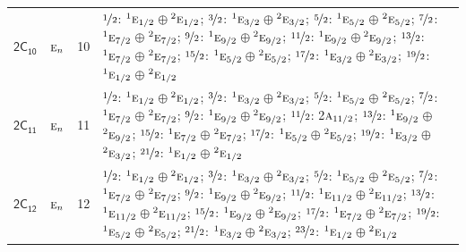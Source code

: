\documentclass[10pt,a4paper]{article}
\numberwithin{equation}{section}
\newcommand{\grp}[1]{\mathsf{#1}}
\newcommand{\irr}[1]{\text{\normalfont\scshape #1}}
\newcommand{\conjpair}[1]{{}^{#1}}
\newlength{\fillwidth}\newlength{\cellwidth}\newlength{\colwidth}
\begin{document}
{\begin{longtable}{@{}llr>{\RaggedRight\arraybackslash}p{\fillwidth}@{}}
\href{2C10.pdf}{$\grp{2C_{10}}$} & $\irr{e}_{n}$ & 10 & $\nicefrac{1}{2}$: $\conjpair{1}\irr{e}_{1/2}$${}\oplus{}$$\conjpair{2}\irr{e}_{1/2}$; $\nicefrac{3}{2}$: $\conjpair{1}\irr{e}_{3/2}$${}\oplus{}$$\conjpair{2}\irr{e}_{3/2}$; $\nicefrac{5}{2}$: $\conjpair{1}\irr{e}_{5/2}$${}\oplus{}$$\conjpair{2}\irr{e}_{5/2}$; $\nicefrac{7}{2}$: $\conjpair{1}\irr{e}_{7/2}$${}\oplus{}$$\conjpair{2}\irr{e}_{7/2}$; $\nicefrac{9}{2}$: $\conjpair{1}\irr{e}_{9/2}$${}\oplus{}$$\conjpair{2}\irr{e}_{9/2}$; $\nicefrac{11}{2}$: $\conjpair{1}\irr{e}_{9/2}$${}\oplus{}$$\conjpair{2}\irr{e}_{9/2}$; $\nicefrac{13}{2}$: $\conjpair{1}\irr{e}_{7/2}$${}\oplus{}$$\conjpair{2}\irr{e}_{7/2}$; $\nicefrac{15}{2}$: $\conjpair{1}\irr{e}_{5/2}$${}\oplus{}$$\conjpair{2}\irr{e}_{5/2}$; $\nicefrac{17}{2}$: $\conjpair{1}\irr{e}_{3/2}$${}\oplus{}$$\conjpair{2}\irr{e}_{3/2}$; $\nicefrac{19}{2}$: $\conjpair{1}\irr{e}_{1/2}$${}\oplus{}$$\conjpair{2}\irr{e}_{1/2}$\\
\href{2C11.pdf}{$\grp{2C_{11}}$} & $\irr{e}_{n}$ & 11 & $\nicefrac{1}{2}$: $\conjpair{1}\irr{e}_{1/2}$${}\oplus{}$$\conjpair{2}\irr{e}_{1/2}$; $\nicefrac{3}{2}$: $\conjpair{1}\irr{e}_{3/2}$${}\oplus{}$$\conjpair{2}\irr{e}_{3/2}$; $\nicefrac{5}{2}$: $\conjpair{1}\irr{e}_{5/2}$${}\oplus{}$$\conjpair{2}\irr{e}_{5/2}$; $\nicefrac{7}{2}$: $\conjpair{1}\irr{e}_{7/2}$${}\oplus{}$$\conjpair{2}\irr{e}_{7/2}$; $\nicefrac{9}{2}$: $\conjpair{1}\irr{e}_{9/2}$${}\oplus{}$$\conjpair{2}\irr{e}_{9/2}$; $\nicefrac{11}{2}$: 2$\irr{a}_{11/2}$; $\nicefrac{13}{2}$: $\conjpair{1}\irr{e}_{9/2}$${}\oplus{}$$\conjpair{2}\irr{e}_{9/2}$; $\nicefrac{15}{2}$: $\conjpair{1}\irr{e}_{7/2}$${}\oplus{}$$\conjpair{2}\irr{e}_{7/2}$; $\nicefrac{17}{2}$: $\conjpair{1}\irr{e}_{5/2}$${}\oplus{}$$\conjpair{2}\irr{e}_{5/2}$; $\nicefrac{19}{2}$: $\conjpair{1}\irr{e}_{3/2}$${}\oplus{}$$\conjpair{2}\irr{e}_{3/2}$; $\nicefrac{21}{2}$: $\conjpair{1}\irr{e}_{1/2}$${}\oplus{}$$\conjpair{2}\irr{e}_{1/2}$\\
\href{2C12.pdf}{$\grp{2C_{12}}$} & $\irr{e}_{n}$ & 12 & $\nicefrac{1}{2}$: $\conjpair{1}\irr{e}_{1/2}$${}\oplus{}$$\conjpair{2}\irr{e}_{1/2}$; $\nicefrac{3}{2}$: $\conjpair{1}\irr{e}_{3/2}$${}\oplus{}$$\conjpair{2}\irr{e}_{3/2}$; $\nicefrac{5}{2}$: $\conjpair{1}\irr{e}_{5/2}$${}\oplus{}$$\conjpair{2}\irr{e}_{5/2}$; $\nicefrac{7}{2}$: $\conjpair{1}\irr{e}_{7/2}$${}\oplus{}$$\conjpair{2}\irr{e}_{7/2}$; $\nicefrac{9}{2}$: $\conjpair{1}\irr{e}_{9/2}$${}\oplus{}$$\conjpair{2}\irr{e}_{9/2}$; $\nicefrac{11}{2}$: $\conjpair{1}\irr{e}_{11/2}$${}\oplus{}$$\conjpair{2}\irr{e}_{11/2}$; $\nicefrac{13}{2}$: $\conjpair{1}\irr{e}_{11/2}$${}\oplus{}$$\conjpair{2}\irr{e}_{11/2}$; $\nicefrac{15}{2}$: $\conjpair{1}\irr{e}_{9/2}$${}\oplus{}$$\conjpair{2}\irr{e}_{9/2}$; $\nicefrac{17}{2}$: $\conjpair{1}\irr{e}_{7/2}$${}\oplus{}$$\conjpair{2}\irr{e}_{7/2}$; $\nicefrac{19}{2}$: $\conjpair{1}\irr{e}_{5/2}$${}\oplus{}$$\conjpair{2}\irr{e}_{5/2}$; $\nicefrac{21}{2}$: $\conjpair{1}\irr{e}_{3/2}$${}\oplus{}$$\conjpair{2}\irr{e}_{3/2}$; $\nicefrac{23}{2}$: $\conjpair{1}\irr{e}_{1/2}$${}\oplus{}$$\conjpair{2}\irr{e}_{1/2}$\\

\end{longtable}}
\end{document}
